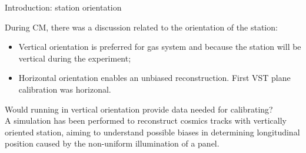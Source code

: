 \documentclass{beamer}[10pt]
\begin{document}
\begin{frame}{Introduction: station orientation}
  
  During CM, there was a discussion related to the orientation of the station:
  \vspace{1mm}
  \begin{itemize}
    \item Vertical orientation is preferred for gas system and because the station will be vertical during the experiment;
    \vspace{1mm}
  \item Horizontal orientation enables an unbiased reconstruction. First VST plane calibration was horizonal.
\end{itemize}
\vspace{3mm}
Would running in vertical orientation provide data needed for calibrating?
\vspace{3mm}
\\
A simulation has been performed to reconstruct cosmics tracks with vertically oriented station,
  aiming to understand possible biases in determining longitudinal position caused by the non-uniform illumination of a panel.
\end{frame}
\end{document}
